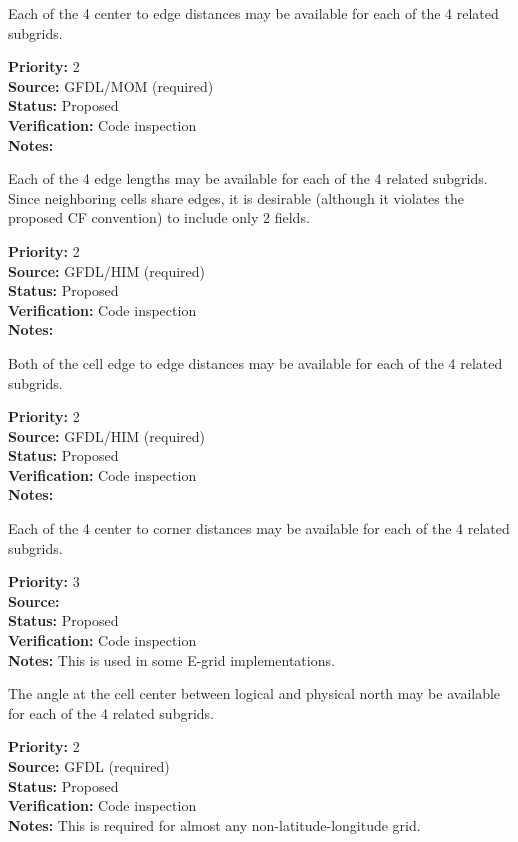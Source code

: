 Each of the 4 center to edge distances may be available for each of the 4 related
subgrids.
\begin{reqlist}
{\bf Priority:} 2 \\
{\bf Source:} GFDL/MOM (required) \\
{\bf Status:} Proposed \\
{\bf Verification:} Code inspection \\
{\bf Notes:} 
\end{reqlist}

Each of the 4 edge lengths may be available for each of the 4 related
subgrids.  Since neighboring cells share edges, it is desirable (although it violates
the proposed CF convention) to include only 2 fields.
\begin{reqlist}
{\bf Priority:} 2 \\
{\bf Source:} GFDL/HIM (required) \\
{\bf Status:} Proposed \\
{\bf Verification:} Code inspection \\
{\bf Notes:} 
\end{reqlist}

Both of the cell edge to edge distances may be available for each of the 4 related
subgrids.
\begin{reqlist}
{\bf Priority:} 2 \\
{\bf Source:} GFDL/HIM (required) \\
{\bf Status:} Proposed \\
{\bf Verification:} Code inspection \\
{\bf Notes:} 
\end{reqlist}

Each of the 4 center to corner distances may be available for each of the 4
related subgrids.
\begin{reqlist}
{\bf Priority:} 3 \\
{\bf Source:}  \\
{\bf Status:} Proposed \\
{\bf Verification:} Code inspection \\
{\bf Notes:} This is used in some E-grid implementations.
\end{reqlist}

The angle at the cell center between logical and physical north may be available
for each of the 4 related subgrids.
\begin{reqlist}
{\bf Priority:} 2 \\
{\bf Source:} GFDL (required) \\
{\bf Status:} Proposed \\
{\bf Verification:} Code inspection \\
{\bf Notes:} This is required for almost any non-latitude-longitude grid.
\end{reqlist}

